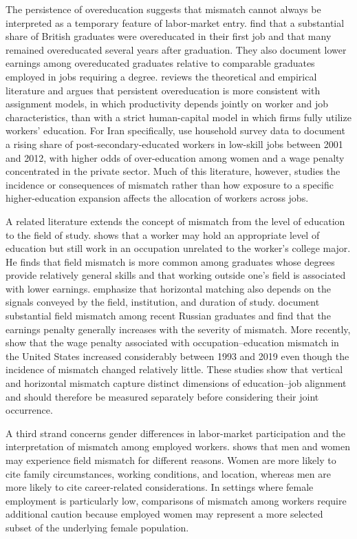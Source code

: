 The persistence of overeducation suggests that mismatch cannot always be interpreted as a temporary feature of labor-market entry. \citet{dolton2000} find that a substantial share of British graduates were overeducated in their first job and that many remained overeducated several years after graduation. They also document lower earnings among overeducated graduates relative to comparable graduates employed in jobs requiring a degree. \citet{mcguinness2006} reviews the theoretical and empirical literature and argues that persistent overeducation is more consistent with assignment models, in which productivity depends jointly on worker and job characteristics, than with a strict human-capital model in which firms fully utilize workers' education. For Iran specifically, \citet{haddad2017} use household survey data to document a rising share of post-secondary-educated workers in low-skill jobs between 2001 and 2012, with higher odds of over-education among women and a wage penalty concentrated in the private sector. Much of this literature, however, studies the incidence or consequences of mismatch rather than how exposure to a specific higher-education expansion affects the allocation of workers across jobs.

A related literature extends the concept of mismatch from the level of education to the field of study. \citet{robst2007major} shows that a worker may hold an appropriate level of education but still work in an occupation unrelated to the worker's college major. He finds that field mismatch is more common among graduates whose degrees provide relatively general skills and that working outside one's field is associated with lower earnings. \citet{domadenik2013} emphasize that horizontal matching also depends on the signals conveyed by the field, institution, and duration of study. \citet{rudakov2019} document substantial field mismatch among recent Russian graduates and find that the earnings penalty generally increases with the severity of mismatch. More recently, \citet{cassidy2023} show that the wage penalty associated with occupation--education mismatch in the United States increased considerably between 1993 and 2019 even though the incidence of mismatch changed relatively little. These studies show that vertical and horizontal mismatch capture distinct dimensions of education--job alignment and should therefore be measured separately before considering their joint occurrence.

A third strand concerns gender differences in labor-market participation and the interpretation of mismatch among employed workers. \citet{robst2007gender} shows that men and women may experience field mismatch for different reasons. Women are more likely to cite family circumstances, working conditions, and location, whereas men are more likely to cite career-related considerations. In settings where female employment is particularly low, comparisons of mismatch among workers require additional caution because employed women may represent a more selected subset of the underlying female population.

